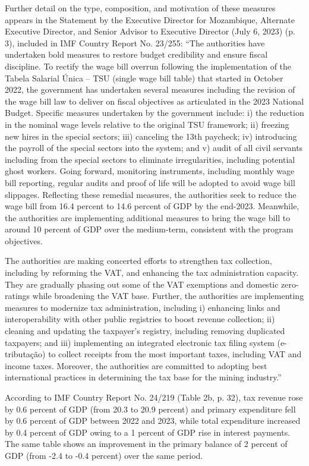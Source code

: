 Further detail on the type, composition, and motivation of these measures appears in the Statement by the Executive Director for Mozambique, Alternate Executive Director, and Senior Advisor to Executive Director (July 6, 2023) (p. 3), included in IMF Country Report No. 23/255: “The authorities have undertaken bold measures to restore budget credibility and ensure fiscal discipline. To rectify the wage bill overrun following the implementation of the Tabela Salarial Única – TSU (single wage bill table) that started in October 2022, the government has undertaken several measures including the revision of the wage bill law to deliver on fiscal objectives as articulated in the 2023 National Budget. Specific measures undertaken by the government include: i) the reduction in the nominal wage levels relative to the original TSU framework; ii) freezing new hires in the special sectors; iii) canceling the 13th paycheck; iv) introducing the payroll of the special sectors into the system; and v) audit of all civil servants including from the special sectors to eliminate irregularities, including potential ghost workers. Going forward, monitoring instruments, including monthly wage bill reporting, regular audits and proof of life will be adopted to avoid wage bill slippages. Reflecting these remedial measures, the authorities seek to reduce the wage bill from 16.4 percent to 14.6 percent of GDP by the end-2023. Meanwhile, the authorities are implementing additional measures to bring the wage bill to around 10 percent of GDP over the medium-term, consistent with the program objectives.

The authorities are making concerted efforts to strengthen tax collection, including by reforming the VAT, and enhancing the tax administration capacity. They are gradually phasing out some of the VAT exemptions and domestic zero-ratings while broadening the VAT base. Further, the authorities are implementing measures to modernize tax administration, including i) enhancing links and interoperability with other public registries to boost revenue collection; ii) cleaning and updating the taxpayer’s registry, including removing duplicated taxpayers; and iii) implementing an integrated electronic tax filing system (e-tributação) to collect receipts from the most important taxes, including VAT and income taxes. Moreover, the authorities are committed to adopting best international practices in determining the tax base for the mining industry.”

According to IMF Country Report No. 24/219 (Table 2b, p. 32), tax revenue rose by 0.6 percent of GDP (from 20.3 to 20.9 percent) and primary expenditure fell by 0.6 percent of GDP between 2022 and 2023, while total expenditure increased by 0.4 percent of GDP owing to a 1 percent of GDP rise in interest payments. The same table shows an improvement in the primary balance of 2 percent of GDP (from -2.4 to -0.4 percent) over the same period.

